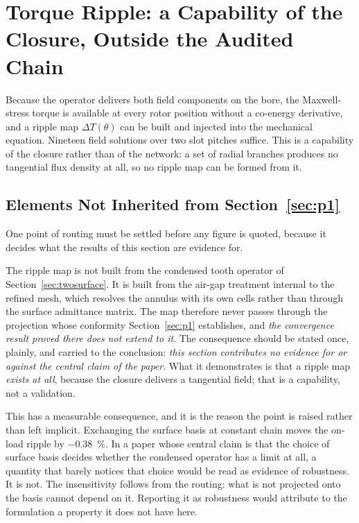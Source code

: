 \documentclass[10pt,a4paper,twocolumn]{article}
\theoremstyle{plain}
\theoremstyle{remark}
\begin{document}
\section{Torque Ripple: a Capability of the Closure, Outside the Audited Chain}
\label{sec:skew}

Because the operator delivers both field components on the bore, the
Maxwell-stress torque is available at every rotor position without a
co-energy derivative, and a ripple map $\Delta T(\theta)$ can be built
and injected into the mechanical equation. Nineteen field solutions over
two slot pitches suffice. This is a capability of the closure rather
than of the network: a set of radial branches produces no tangential
flux density at all, so no ripple map can be formed from it.

\subsection{Elements Not Inherited from Section~\ref{sec:p1}}
\label{sub:ripple_scope}

One point of routing must be settled before any figure is quoted,
because it decides what the results of this section are evidence for.

The ripple map is not built from the condensed tooth operator of
Section~\ref{sec:twosurface}. It is built from the air-gap treatment
internal to the refined mesh, which resolves the annulus with its own
cells rather than through the surface admittance matrix. The map
therefore never passes through the projection whose conformity
Section~\ref{sec:p1} establishes, and \emph{the convergence result
proved there does not extend to it}. The consequence should be stated
once, plainly, and carried to the conclusion: \emph{this section
contributes no evidence for or against the central claim of the paper}.
What it demonstrates is that a ripple map \emph{exists at all}, because
the closure delivers a tangential field; that is a capability, not a
validation.

This has a measurable consequence, and it is the reason the point is
raised rather than left implicit. Exchanging the surface basis at
constant chain moves the on-load ripple by \SI{-0.38}{\percent}. In a
paper whose central claim is that the choice of surface basis decides
whether the condensed operator has a limit at all, a quantity that
barely notices that choice would be read as evidence of robustness. It
is not. The insensitivity follows from the routing: what is not
projected onto the basis cannot depend on it. Reporting it as
robustness would attribute to the formulation a property it does not
have here.
\end{document}

